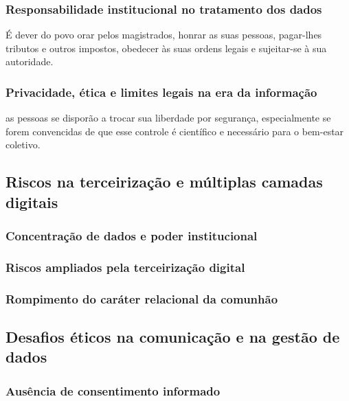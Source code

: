 \subsubsection{Responsabilidade institucional no tratamento dos dados}

\begin{citacao}
É dever do povo orar pelos magistrados, honrar as suas pessoas, pagar-lhes tributos e outros impostos, obedecer às suas ordens legais e sujeitar-se à sua autoridade.\cite[Cap. XXIII]{cfw}
\end{citacao}

\subsubsection{Privacidade, ética e limites legais na era da informação}

\begin{citacao}
as pessoas se disporão a trocar sua liberdade por segurança, especialmente se forem convencidas de que esse controle é científico e necessário para o bem-estar coletivo. \cite[p. 165]{schaeffer2002}
\end{citacao}

\subsection{Riscos na terceirização e múltiplas camadas digitais}

\subsubsection{Concentração de dados e poder institucional}

\subsubsection{Riscos ampliados pela terceirização digital}

\subsubsection{Rompimento do caráter relacional da comunhão}

\subsection{Desafios éticos na comunicação e na gestão de dados}

\subsubsection{Ausência de consentimento informado}


